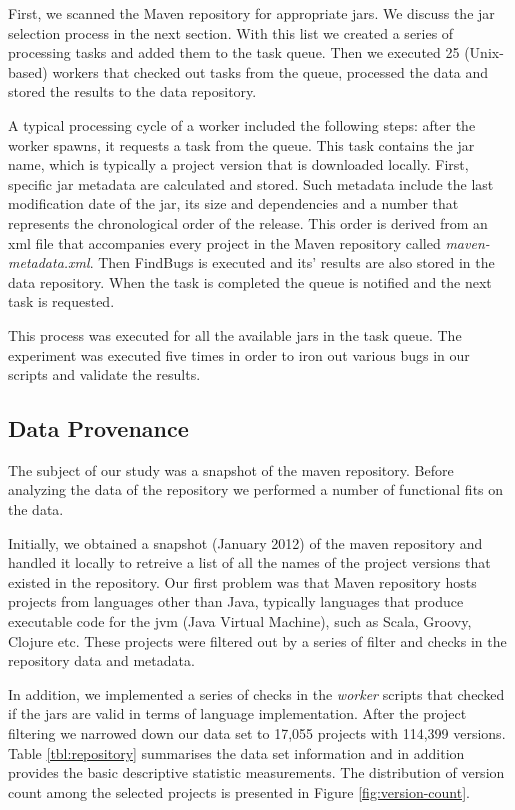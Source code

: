 \documentclass[conference]{IEEEtran}
\begin{document}
First, we scanned the Maven repository for appropriate {\sc jar}s.
We discuss the {\sc jar} selection process in the next 
section. With this list we created a series of processing tasks
and added them to the task queue. Then we
executed 25 (Unix-based) workers that checked out tasks from the queue,
processed the data and stored the results to the data repository.

A typical processing cycle of a worker included the following steps: after
the worker spawns, it requests a task from the queue. This task contains
the {\sc jar} name, which is typically a project version that is downloaded locally.
First, specific {\sc jar} metadata are calculated and stored. Such metadata include the
last modification date of the {\sc jar}, its size and dependencies and a number that
represents the chronological order of the release. This order is derived from an {\sc xml} file that
accompanies every project in the Maven repository called {\it
maven-metadata.xml}. Then FindBugs is executed and its' results are also stored
in the data repository. When the task is completed the queue is notified and
the next task is requested.

This process was executed for all the available {\sc jar}s in the task queue.
The experiment was executed five times in order to iron out various bugs in
our scripts and validate the results. 

\subsection{Data Provenance}
\label{sec:data}

The subject of our study was a snapshot of the maven repository. Before
analyzing the data of the repository we performed a number of functional fits
on the data. 

Initially, we obtained a snapshot (January 2012) of the maven repository and
handled it locally to retreive a list of all the names of the project versions that existed in the
repository. Our first problem was that Maven repository hosts projects from languages other than Java, typically languages that produce executable code for the {\sc jvm} (Java Virtual Machine), such as Scala, Groovy, Clojure etc. These projects were filtered out by a series of filter and checks in the repository data and metadata.

In addition, we implemented a series of checks in the \textit{worker} scripts that checked if the jars are valid in terms of language implementation. After the project filtering we narrowed down our data set to 17,055 projects with 114,399 versions. Table \ref{tbl:repository} summarises the data set information and in addition provides the basic descriptive statistic measurements. The distribution of version count among the selected projects is presented in Figure \ref{fig:version-count}.
\end{document}
